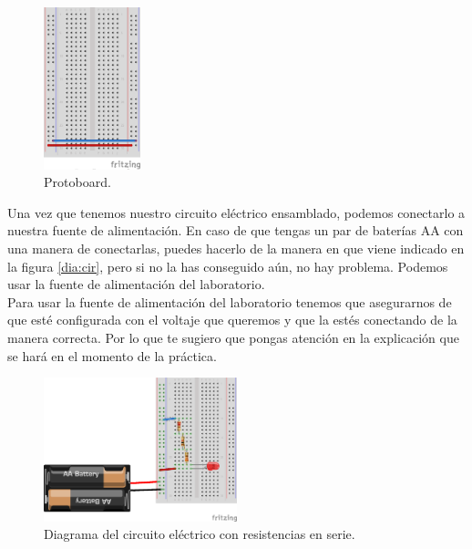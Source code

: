     \begin{figure}[h]
    	\begin{center}
    		\includegraphics[width=0.25\textwidth]{images/protoboard.png}
    		\caption{Protoboard.}
    		\label{dia:proto}
    	\end{center}
    \end{figure}

    Una vez que tenemos nuestro circuito eléctrico ensamblado, podemos conectarlo a nuestra fuente de alimentación. En caso de que tengas un par de baterías AA con una manera de conectarlas, puedes hacerlo de la manera en que viene indicado en la figura \ref{dia:cir}, pero si no la has conseguido aún, no hay problema. Podemos usar la fuente de alimentación del laboratorio. \\

    Para usar la fuente de alimentación del laboratorio tenemos que asegurarnos de que esté configurada con el voltaje que queremos y que la estés conectando de la manera correcta. Por lo que te sugiero que pongas atención en la explicación que se hará en el momento de la práctica. \\

    \begin{figure}[h]
    	\begin{center}
    		\includegraphics[width=0.5\textwidth]{images/LED-bateria-resistencias.png}
    		\caption{Diagrama del circuito eléctrico con resistencias en serie.}
    		\label{dia:serie}
    	\end{center}
    \end{figure}

